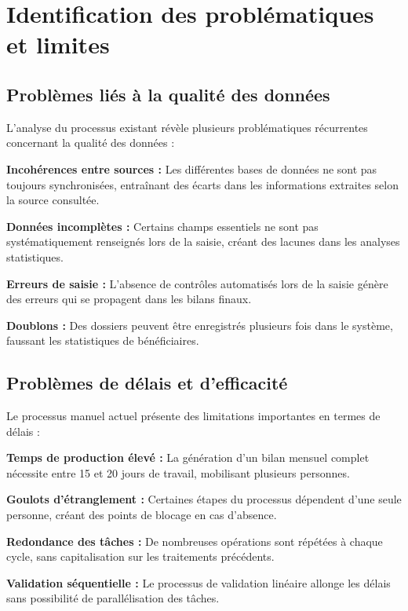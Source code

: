 \section{Identification des problématiques et limites}

\subsection{Problèmes liés à la qualité des données}

L'analyse du processus existant révèle plusieurs problématiques récurrentes concernant la qualité des données :

\medskip

\textbf{Incohérences entre sources :} Les différentes bases de données ne sont pas toujours synchronisées, entraînant des écarts dans les informations extraites selon la source consultée.

\textbf{Données incomplètes :} Certains champs essentiels ne sont pas systématiquement renseignés lors de la saisie, créant des lacunes dans les analyses statistiques.

\textbf{Erreurs de saisie :} L'absence de contrôles automatisés lors de la saisie génère des erreurs qui se propagent dans les bilans finaux.

\textbf{Doublons :} Des dossiers peuvent être enregistrés plusieurs fois dans le système, faussant les statistiques de bénéficiaires.

\subsection{Problèmes de délais et d'efficacité}

Le processus manuel actuel présente des limitations importantes en termes de délais :

\medskip

\textbf{Temps de production élevé :} La génération d'un bilan mensuel complet nécessite entre 15 et 20 jours de travail, mobilisant plusieurs personnes.

\textbf{Goulots d'étranglement :} Certaines étapes du processus dépendent d'une seule personne, créant des points de blocage en cas d'absence.

\textbf{Redondance des tâches :} De nombreuses opérations sont répétées à chaque cycle, sans capitalisation sur les traitements précédents.

\textbf{Validation séquentielle :} Le processus de validation linéaire allonge les délais sans possibilité de parallélisation des tâches.

